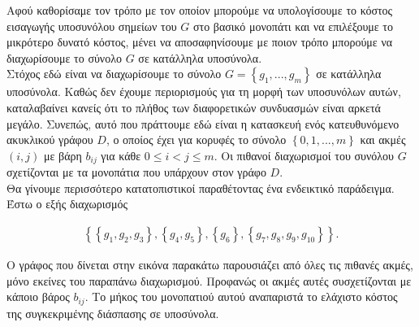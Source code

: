 \documentclass[oneside,12pt]{book}
\theoremstyle{definition}
\begin{document}
Αφού καθορίσαμε τον τρόπο με τον οποίον μπορούμε να υπολογίσουμε το κόστος εισαγωγής υποσυνόλου σημείων του \(G\) στο βασικό μονοπάτι και να επιλέξουμε το μικρότερο δυνατό κόστος, μένει να αποσαφηνίσουμε με ποιον τρόπο μπορούμε να διαχωρίσουμε το σύνολο \(G\) σε κατάλληλα υποσύνολα. \\

Στόχος εδώ είναι να διαχωρίσουμε το σύνολο \(G = \left\{g_1,...,g_m\right\}\) σε κατάλληλα υποσύνολα. Καθώς δεν έχουμε περιορισμούς για τη μορφή των υποσυνόλων αυτών, καταλαβαίνει κανείς ότι το πλήθος των διαφορετικών συνδυασμών είναι αρκετά μεγάλο. Συνεπώς, αυτό που πράττουμε εδώ είναι η κατασκευή ενός κατευθυνόμενο ακυκλικού γράφου \(D\), ο οποίος έχει για κορυφές το σύνολο \(\left\{0,1,...,m\right\}\) και ακμές \((i,j)\) με βάρη \(b_{ij}\) για κάθε \(0 \leq i < j \leq m\). Οι πιθανοί διαχωρισμοί του συνόλου \(G\) σχετίζονται με τα μονοπάτια που υπάρχουν στον γράφο \(D\). \\

Θα γίνουμε περισσότερο κατατοπιστικοί παραθέτοντας ένα ενδεικτικό παράδειγμα. Έστω ο εξής διαχωρισμός

\begin{align*}
	\left\{ \left\{ g_1,g_2,g_3 \right\}, \left\{ g_4,g_5 \right\}, \left\{ g_6 \right\}, \left\{ g_7,g_8,g_9, g_{10} \right\}\right\}.
\end{align*}

Ο γράφος που δίνεται στην εικόνα παρακάτω παρουσιάζει από όλες τις πιθανές ακμές, μόνο εκείνες του παραπάνω διαχωρισμού. Προφανώς οι ακμές αυτές συσχετίζονται με κάποιο βάρος \(b_{ij}\). Το μήκος του μονοπατιού αυτού αναπαριστά το ελάχιστο κόστος της συγκεκριμένης διάσπασης σε υποσύνολα.\\
\end{document}

